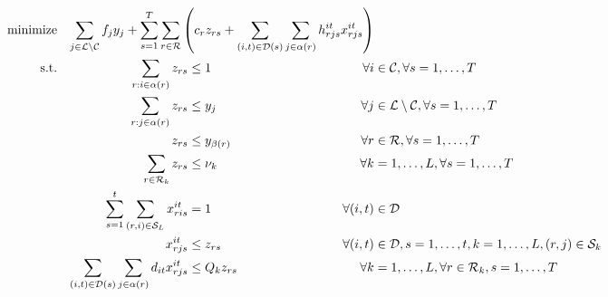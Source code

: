                 \begin{alignat}{3}
                    \text{minimize} &&\sum_{j\in \loc \setminus \cu} f_{j} y_{j} +\sum_{s=1}^{T}  \sum_{r\in \ro} \left(c_r z_{rs} + \sum_{(i,t)\in\mathcal{D}(s)} \sum_{j\in\alpha(r)} h^{it}_{rjs}x^{it}_{rjs}\right)\span\span\label{objfunct2}\\ 
    \text{s.t.}  %
    &&\sum_{r : i\in\alpha(r)} z_{rs} &\leq 1 															&\forall i&\in \cu, \forall s=1,\ldots,T  \label{const:singleroutecustomers2}\\
    &&\sum_{r : j\in\alpha(r)} z_{rs} &\leq y_j 															&\forall j&\in \loc\setminus \cu, \forall s=1,\ldots,T  \label{const:singleroutedc2}\\
    &&z_{rs} 					&\leq y_{\beta(r)} 													&\forall r&\in \ro, \forall s=1,\ldots,T\label{const:startfromopendepots2}\\
    &&\sum_{r\in \ro_k} z_{rs} &\leq 	\nu_k													&\forall k&=1,\ldots,L, \forall s=1,\ldots,T  \label{const:fleetcapa2}\\
    &&\sum_{s=1}^t \sum_{(r,i)\in \mathcal{S}_L}x^{it}_{ris}   		& = 1 														&\forall (i,t)&\in\mathcal{D}\label{const:satdemands}\\
    &&x^{it}_{rjs}   		&\leq  z_{rs}													&\forall (i,t)&\in\mathcal{D}, s=1,\ldots,t,k=1,\ldots,L, (r,j)\in\mathcal{S}_k\label{const:deliveryConstLoc2}\\
    &&\sum_{(i,t)\in\mathcal{D}(s)}\sum_{j\in\alpha(r)} d_{it} x^{it}_{rjs}   		&\leq Q_k z_{rs} 														&\forall k&=1,\ldots,L, \forall r\in \ro_k, s=1,\ldots,T\label{const:deliveryUB2}\\

\end{alignat}
